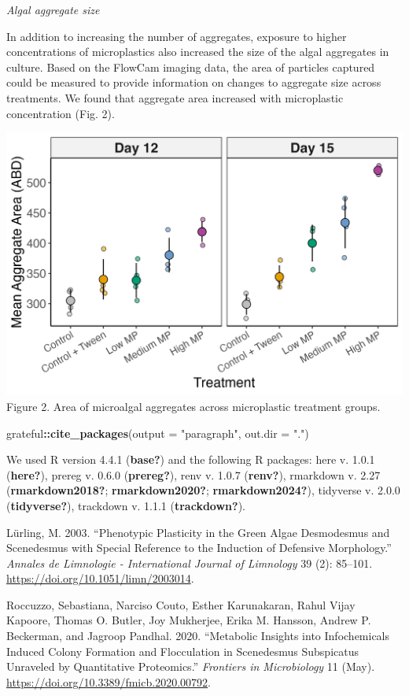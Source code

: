\documentclass[
]{article}
\newenvironment{Shaded}{\begin{snugshade}}{\end{snugshade}}
\newcommand{\AttributeTok}[1]{\textcolor[rgb]{0.13,0.29,0.53}{#1}}
\newcommand{\FunctionTok}[1]{\textcolor[rgb]{0.13,0.29,0.53}{\textbf{#1}}}
\newcommand{\NormalTok}[1]{#1}
\newcommand{\SpecialCharTok}[1]{\textcolor[rgb]{0.81,0.36,0.00}{\textbf{#1}}}
\newcommand{\StringTok}[1]{\textcolor[rgb]{0.31,0.60,0.02}{#1}}
\newlength{\cslhangindent}
\newenvironment{CSLReferences}[2] %
 {\begin{list}{}{%
  \setlength{\itemindent}{0pt}
  \setlength{\leftmargin}{0pt}
  \setlength{\parsep}{0pt}
  \ifodd #1
   \setlength{\leftmargin}{\cslhangindent}
   \setlength{\itemindent}{-1\cslhangindent}
  \fi
  \setlength{\itemsep}{#2\baselineskip}}}
 {\end{list}}
\begin{document}
\emph{Algal aggregate size}

In addition to increasing the number of aggregates, exposure to higher
concentrations of microplastics also increased the size of the algal
aggregates in culture. Based on the FlowCam imaging data, the area of
particles captured could be measured to provide information on changes
to aggregate size across treatments. We found that aggregate area
increased with microplastic concentration (Fig. 2).

\includegraphics{03_figures/nod1.agg.area.png} Figure 2. Area of
microalgal aggregates across microplastic treatment groups.

\begin{Shaded}
\begin{Highlighting}[]
\NormalTok{grateful}\SpecialCharTok{::}\FunctionTok{cite\_packages}\NormalTok{(}\AttributeTok{output =} \StringTok{"paragraph"}\NormalTok{, }\AttributeTok{out.dir =} \StringTok{"."}\NormalTok{)}
\end{Highlighting}
\end{Shaded}

We used R version 4.4.1 (\textbf{base?}) and the following R packages:
here v. 1.0.1 (\textbf{here?}), prereg v. 0.6.0 (\textbf{prereg?}), renv
v. 1.0.7 (\textbf{renv?}), rmarkdown v. 2.27 (\textbf{rmarkdown2018?};
\textbf{rmarkdown2020?}; \textbf{rmarkdown2024?}), tidyverse v. 2.0.0
(\textbf{tidyverse?}), trackdown v. 1.1.1 (\textbf{trackdown?}).

\label{refs}
\begin{CSLReferences}{1}{0}
Lürling, M. 2003. {``Phenotypic Plasticity in the Green Algae
Desmodesmus and Scenedesmus with Special Reference to the Induction of
Defensive Morphology.''} \emph{Annales de Limnologie - International
Journal of Limnology} 39 (2): 85--101.
\url{https://doi.org/10.1051/limn/2003014}.

Roccuzzo, Sebastiana, Narciso Couto, Esther Karunakaran, Rahul Vijay
Kapoore, Thomas O. Butler, Joy Mukherjee, Erika M. Hansson, Andrew P.
Beckerman, and Jagroop Pandhal. 2020. {``Metabolic Insights into
Infochemicals Induced Colony Formation and Flocculation in Scenedesmus
Subspicatus Unraveled by Quantitative Proteomics.''} \emph{Frontiers in
Microbiology} 11 (May). \url{https://doi.org/10.3389/fmicb.2020.00792}.

\end{CSLReferences}
\end{document}
